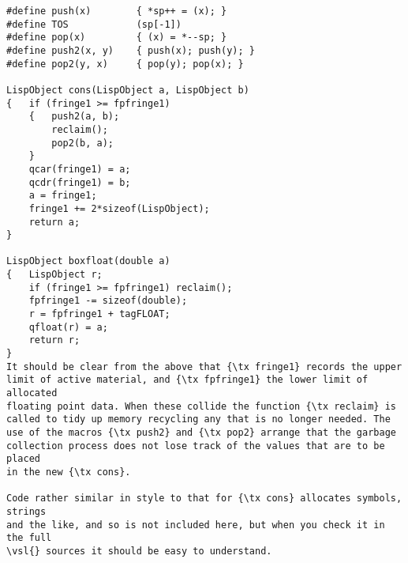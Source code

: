 {\small\begin{verbatim}
#define push(x)        { *sp++ = (x); }
#define TOS            (sp[-1])
#define pop(x)         { (x) = *--sp; }
#define push2(x, y)    { push(x); push(y); }
#define pop2(y, x)     { pop(y); pop(x); }

LispObject cons(LispObject a, LispObject b)
{   if (fringe1 >= fpfringe1)
    {   push2(a, b);
        reclaim();
        pop2(b, a);
    }
    qcar(fringe1) = a;
    qcdr(fringe1) = b;
    a = fringe1;
    fringe1 += 2*sizeof(LispObject);
    return a;
}

LispObject boxfloat(double a)
{   LispObject r;
    if (fringe1 >= fpfringe1) reclaim();
    fpfringe1 -= sizeof(double);
    r = fpfringe1 + tagFLOAT;
    qfloat(r) = a;
    return r;
}
It should be clear from the above that {\tx fringe1} records the upper
limit of active material, and {\tx fpfringe1} the lower limit of allocated
floating point data. When these collide the function {\tx reclaim} is
called to tidy up memory recycling any that is no longer needed. The
use of the macros {\tx push2} and {\tx pop2} arrange that the garbage
collection process does not lose track of the values that are to be placed
in the new {\tx cons}.

Code rather similar in style to that for {\tx cons} allocates symbols, strings
and the like, and so is not included here, but when you check it in the full
\vsl{} sources it should be easy to understand.

\end{verbatim}}

